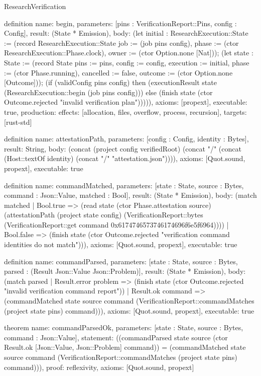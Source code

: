 \begin{lexlean}{ResearchVerification}
\begin{semanticmodule}
definition{
  name: begin,
  parameters: [pins : VerificationReport::Pins, config : Config],
  result: (State * Emission),
  body: (let initial : ResearchExecution::State := (record ResearchExecution::State {job := (job pins config), phase := (ctor ResearchExecution::Phase.clock), owner := (ctor Option.none [Nat])}); (let state : State := (record State {pins := pins, config := config, execution := initial, phase := (ctor Phase.running), cancelled := false, outcome := (ctor Option.none [Outcome])}); (if (validConfig pins config) then (executionResult state (ResearchExecution::begin (job pins config))) else (finish state (ctor Outcome.rejected "invalid verification plan"))))),
  axioms: [propext],
  executable: true,
  production: {effects: [allocation, files, overflow, process, recursion], targets: [rust-std]}
}

definition{
  name: attestationPath,
  parameters: [config : Config, identity : Bytes],
  result: String,
  body: (concat (project config verifiedRoot) (concat "/" (concat (Host::textOf identity) (concat "/" "attestation.json")))),
  axioms: [Quot.sound, propext],
  executable: true
}

definition{
  name: commandMatched,
  parameters: [state : State, source : Bytes, command : Json::Value, matched : Bool],
  result: (State * Emission),
  body: (match matched | Bool.true => (read state (ctor Phase.attestation source) (attestationPath (project state config) (VerificationReport::bytes (VerificationReport::get command 0x6174746573746174696f6e5f6964)))) | Bool.false => (finish state (ctor Outcome.rejected "verification command identities do not match"))),
  axioms: [Quot.sound, propext],
  executable: true
}

definition{
  name: commandParsed,
  parameters: [state : State, source : Bytes, parsed : (Result Json::Value Json::Problem)],
  result: (State * Emission),
  body: (match parsed | Result.error problem => (finish state (ctor Outcome.rejected "invalid verification command report")) | Result.ok command => (commandMatched state source command (VerificationReport::commandMatches (project state pins) command))),
  axioms: [Quot.sound, propext],
  executable: true
}

theorem{
  name: commandParsedOk,
  parameters: [state : State, source : Bytes, command : Json::Value],
  statement: ((commandParsed state source (ctor Result.ok [Json::Value, Json::Problem] command)) = (commandMatched state source command (VerificationReport::commandMatches (project state pins) command))),
  proof: reflexivity{},
  axioms: [Quot.sound, propext]
}


\end{semanticmodule}
\end{lexlean}
